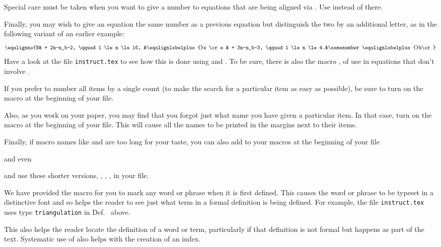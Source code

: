 Special care must be taken when you want to give a number to equations that
are being aligned via . Use  instead of
 there.

Finally, you may wish to give an equation the same number as a previous
equation but distinguish the two by an additional letter, as in the
following variant of an earlier example:
$$\eqalignno{N& =  2n-n_b-2, \qquad 1 \le n \le 16, &\eqalignlabelplus{}a \cr
            e & =  3n-n_b-3, \qquad 1 \le n \le 4.&\samenumber\eqalignlabelplus{}b\cr}$$
Have a look at the file {\tt instruct.tex} to see how this is done using
 and . To be sure, there is also the macro
, of use in equations that don't involve .

If you prefer to number all items by a single count (to make the search for a
particular item as easy as possible), be sure to turn on the 
macro at the beginning of your \Tex file.

Also, as you work on your paper, you may find that you forgot just what name
you have given a particular item. In that case, turn on the  macro
at the beginning of your \Tex file. This will cause all the names to be
printed in the margins next to their items.

Finally, if macro names like  and  are too long for your
taste, you can also add to your macros at the beginning of your \Tex file


\noindent and even


\noindent and use these shorter versions, , , , in
your \Tex file.

We have provided the macro  for you to mark any word or phrase when
it is first defined. This causes the word or phrase to be typeset in a
distinctive font and so helps the reader to see just what term in a formal
definition is being defined. For example, the file {\tt instruct.tex} uses
type { \tt \lb{}triangulation\rb}
in Def.~ above.

This also helps the reader locate the definition of a word or term,
particularly if that definition is not formal but happens as part of the text.
Systematic use of  also helps with the creation of an index.

